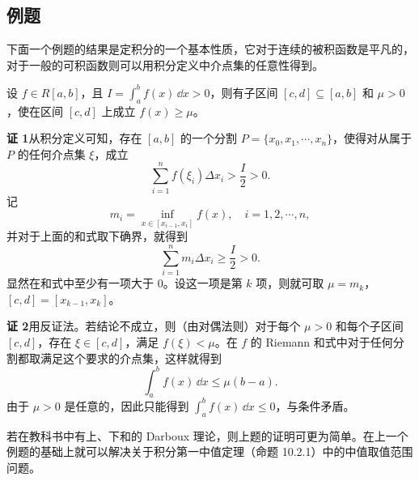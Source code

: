 \subsection{例题}

下面一个例题的结果是定积分的一个基本性质，它对于连续的被积函数是平凡的，对于一般的可积函数则可以用积分定义中介点集的任意性得到。

\begin{xexample}[10.2.1]
设 $f\in R[a,b]$，且 $I=\int_a^b f(x)\,\dd x>0$，则有子区间 $[c,d]\subseteq[a,b]$ 和 $\mu>0$，使在区间 $[c,d]$ 上成立 $f(x)\geqslant\mu$。
\end{xexample}
\begin{xsolution}
\textbf{证 1}\quad 从积分定义可知，存在 $[a,b]$ 的一个分割 $P=\{x_0,x_1,\cdots,x_n\}$，使得对从属于 $P$ 的任何介点集 $\xi$，成立
\[
  \sum_{i=1}^n f(\xi_i)\Delta x_i>\frac I2>0.
\]
记
\[
  m_i=\inf_{x\in[x_{i-1},x_i]}f(x),\quad i=1,2,\cdots,n,
\]
并对于上面的和式取下确界，就得到
\[
  \sum_{i=1}^n m_i\Delta x_i\geqslant\frac I2>0.
\]
显然在和式中至少有一项大于 0。设这一项是第 $k$ 项，则就可取 $\mu=m_k$，$[c,d]=[x_{k-1},x_k]$。

\textbf{证 2}\quad 用反证法。若结论不成立，则（由对偶法则）对于每个 $\mu>0$ 和每个子区间 $[c,d]$，存在 $\xi\in[c,d]$，满足 $f(\xi)<\mu$。在 $f$ 的 Riemann 和式中对于任何分割都取满足这个要求的介点集，这样就得到
\[
  \int_a^b f(x)\,\dd x\leqslant\mu(b-a).
\]
由于 $\mu>0$ 是任意的，因此只能得到 $\int_a^b f(x)\,\dd x\leqslant0$，与条件矛盾。
\end{xsolution}


\begin{xremark}
若在教科书中有上、下和的 Darboux 理论，则上题的证明可更为简单。在上一个例题的基础上就可以解决关于积分第一中值定理（命题 10.2.1）中的中值取值范围问题。
\end{xremark}

